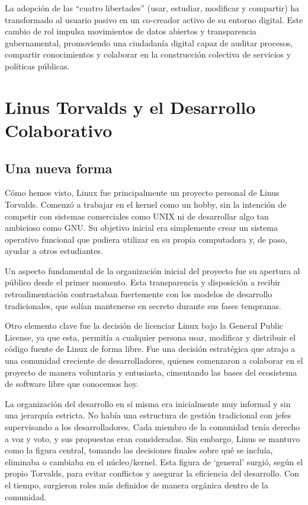 \documentclass[a4paper,12pt]{article}
\begin{document}
La adopción de las ``cuatro libertades'' (usar, estudiar, modificar y compartir)
ha transformado al usuario pasivo en un co-creador activo de su entorno digital.
Este cambio de rol impulsa movimientos de datos abiertos y transparencia
gubernamental, promoviendo una ciudadanía digital capaz de auditar procesos,
compartir conocimientos y colaborar en la construcción colectiva de servicios y
políticas públicas.


\newpage
\section{Linus Torvalds y el Desarrollo Colaborativo}

\subsection{Una nueva forma}

Cómo hemos visto, Linux fue principalmente un proyecto personal de Linus Torvalds.
Comenzó a trabajar en el kernel como un hobby, sin la intención de competir con
sistemas comerciales como UNIX ni de desarrollar algo tan ambicioso como GNU. Su
objetivo inicial era simplemente crear un sistema operativo funcional que
pudiera utilizar en su propia computadora y, de paso, ayudar a otros
estudiantes.

Un aspecto fundamental de la organización inicial del proyecto fue su apertura
al público desde el primer momento. Esta transparencia y disposición a recibir
retroalimentación contrastaban fuertemente con los modelos de desarrollo
tradicionales, que solían mantenerse en secreto durante sus fases tempranas.

Otro elemento clave fue la decisión de licenciar Linux bajo la General
Public License, ya que esta, permitía a cualquier persona usar, modificar
y distribuir el código fuente de Linux de forma libre. Fue una decisión
estratégica que atrajo a una comunidad creciente de desarrolladores, quienes
comenzaron a colaborar en el proyecto de manera voluntaria y entusiasta,
cimentando las bases del ecosistema de software libre que conocemos hoy.

La organización del desarrollo en sí misma era inicialmente muy informal y sin
una jerarquía estricta. No había una estructura de gestión tradicional con jefes
supervisando a los desarrolladores. Cada miembro de la comunidad tenía derecho a
voz y voto, y sus propuestas eran consideradas. Sin embargo, Linus se
mantuvo como la figura central, tomando las decisiones finales sobre qué se
incluía, eliminaba o cambiaba en el núcleo/kernel. Esta figura de `general'
surgió, según el propio Torvalds, para evitar conflictos y asegurar la
eficiencia del desarrollo.  Con el tiempo, surgieron roles más definidos de
manera orgánica dentro de la comunidad.
\end{document}
